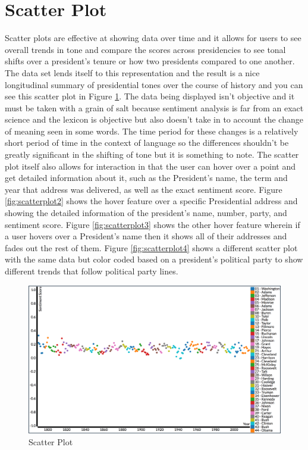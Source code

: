 \section{Scatter Plot}
Scatter plots are effective at showing data over time and it allows for users to see overall trends in tone and compare the scores across presidencies to see tonal shifts over a president's tenure or how two presidents compared to one another.
The data set lends itself to this representation and the result is a nice longitudinal summary of presidential tones over the course of history and you can see this scatter plot in Figure \ref{fig:scatterplot1}.
The data being displayed isn't objective and it must be taken with a grain of salt because sentiment analysis is far from an exact science and the lexicon is objective but also doesn't take in to account the change of meaning seen in some words.
The time period for these changes is a relatively short period of time in the context of language so the differences shouldn't be greatly significant in the shifting of tone but it is something to note.
The scatter plot itself also allows for interaction in that the user can hover over a point and get detailed information about it, such as the President's name, the term and year that address was delivered, as well as the exact sentiment score.
Figure \ref{fig:scatterplot2} shows the hover feature over a specific Presidential address and showing the detailed information of the president's name, number, party, and sentiment score.
Figure \ref{fig:scatterplot3} shows the other hover feature wherein if a user hovers over a President's name then it shows all of their addresses and fades out the rest of them.
Figure \ref{fig:scatterplot4} shows a different scatter plot with the same data but color coded based on a president's political party to show different trends that follow political party lines.

\begin{figure}
  \includegraphics[width=\columnwidth]{images/scatter_plot.png}
  \caption{Scatter Plot}
  \label{fig:scatterplot1}
\end{figure}


